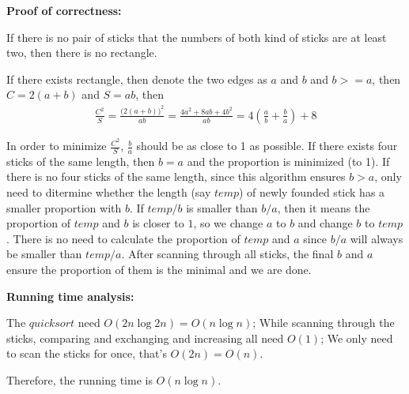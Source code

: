 \documentclass{article}
\begin{document}
{\par\textbf{Proof of correctness: }
\par If there is no pair of sticks that the numbers of both kind of sticks are at least two, then there is no rectangle.
\par If there exists rectangle, then denote the two edges as $a$ and $b$ and $b>=a$, then $C = 2(a+b)$ and $S = ab$, then 
\begin{align*}
	\frac{C^2}{S} = \frac{{(2(a+b)})^2}{ab} = \frac{4a^2+8ab+4b^2}{ab} = 4(\frac{a}{b}+\frac{b}{a})+8
\end{align*}
\par In order to minimize $\frac{C^2}{S}$, $\frac{b}{a}$ should be as close to 1 as possible. If there exists four sticks of the same length, then $b = a$ and the proportion is minimized (to 1). If there is no four sticks of the same length, since this algorithm ensures $b > a$, only need to ditermine whether the length (say $temp$) of newly founded stick has a smaller proportion with $b$. If $temp/b$ is smaller than $b/a$, then it means the proportion of $temp$ and $b$ is closer to $1$, so we change $a$ to $b$ and change $b$ to $temp$. There is no need to calculate the proportion of $temp$ and $a$ since $b/a$ will always be smaller than $temp/a$. After scanning through all sticks, the final $b$ and $a$ ensure the proportion of them is the minimal and we are done.\\

\par\textbf{Running time analysis: }
\par The $quicksort$ need $O(2n\log 2n) = O(n\log n)$; While scanning through the sticks, comparing and exchanging and increasing all need $O(1)$; We only need to scan the sticks for once, that's $O(2n) = O(n)$.
\par Therefore, the running time is $O(n\log n)$.
}
\pagebreak
\end{document}
